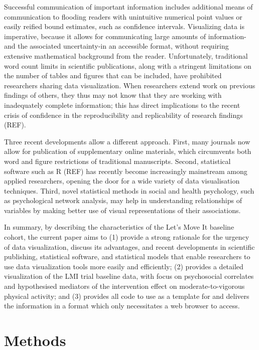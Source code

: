 \documentclass[english,floatsintext,]{apa6}
\theoremstyle{definition}
\theoremstyle{definition}
\theoremstyle{definition}
\theoremstyle{remark}
\begin{document}
Successful communication of important information includes additional
means of communication to flooding readers with unintuitive numerical
point values or easily reified bound estimates, such as confidence
intervals. Visualizing data is imperative, because it allows for
communicating large amounts of information-and the associated
uncertainty-in an accessible format, without requiring extensive
mathematical background from the reader. Unfortunately, traditional word
count limits in scientific publications, along with a stringent
limitations on the number of tables and figures that can be included,
have prohibited researchers sharing data visualization. When researchers
extend work on previous findings of others, they thus may not know that
they are working with inadequately complete information; this has direct
implications to the recent crisis of confidence in the reproducibility
and replicability of research findings (REF).

Three recent developments allow a different approach. First, many
journals now allow for publication of supplementary online materials,
which circumvents both word and figure restrictions of traditional
manuscripts. Second, statistical software such as R (REF) has recently
become increasingly mainstream among applied researchers, opening the
door for a wide variety of data visualisation techniques. Third, novel
statistical methods in social and health psychology, such as
psychological network analysis, may help in understanding relationships
of variables by making better use of visual representations of their
associations.

In summary, by describing the characteristics of the Let's Move It
baseline cohort, the current paper aims to (1) provide a strong
rationale for the urgency of data visualization, discuss its advantages,
and recent developments in scientific publishing, statistical software,
and statistical models that enable researchers to use data visualization
tools more easily and efficiently; (2) provides a detailed visualization
of the LMI trial baseline data, with focus on psychosocial correlates
and hypothesised mediators of the intervention effect on
moderate-to-vigorous physical activity; and (3) provides all code to use
as a template for and delivers the information in a format which only
necessitates a web browser to access.

\section{Methods}\label{methods}
\end{document}
